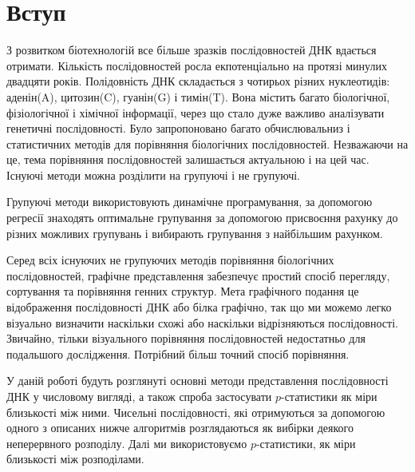 \documentclass[14pt]{extarticle}
\begin{document}
%
 \tableofcontents
 \newpage
\section{Вступ}
З розвитком біотехнологій все більше зразків послідовностей ДНК вдається отримати. Кількість послідовностей росла екпотенціально на протязі минулих двадцяти років. Полідовність ДНК складається з чотирьох різних нуклеотидів: аденін(A), цитозин(C), гуанін(G) і тимін(T). Вона містить багато біологічної, фізіологічної і хімічної інформації, через що стало дуже важливо аналізувати генетичні послідовності. Було запропоновано багато обчислювальниз і статистичних методів для порівняння біологічних послідовностей. Незважаючи на це, тема порівняння послідовностей залишається актуальною і на цей час. Існуючі методи можна розділити на групуючі і не групуючі. \par
Групуючі методи використовують динамічне програмування, за допомогою регресії знаходять оптимальне групування за допомогою присвоєння рахунку до різних можливих групувань і вибирають групування з найбільшим рахунком. \par
Серед всіх існуючих не групуючих методів порівняння біологічних послідовностей, графічне представлення забезпечує простий спосіб перегляду, сортування та порівняння генних структур. Мета графічного подання це відображення послідовності ДНК або білка графічно, так що ми можемо легко візуально визначити наскільки схожі або наскільки відрізняються послідовності. Звичайно, тільки візуального порівняння послідовностей недостатньо для подальшого дослідження. Потрібний більш точний спосіб порівняння. \par
У даній роботі будуть розглянуті основні методи представлення послідовності ДНК у числовому вигляді, а також спроба застосувати $p$-статистики як міри близькості між ними. Чисельні послідовності, які отримуються за допомогою одного з описаних нижче алгоритмів розглядаються як вибірки деякого неперервного розподілу. Далі ми використовуємо $p$-статистики, як міри близькості між розподілами.


\newpage
\end{document}
